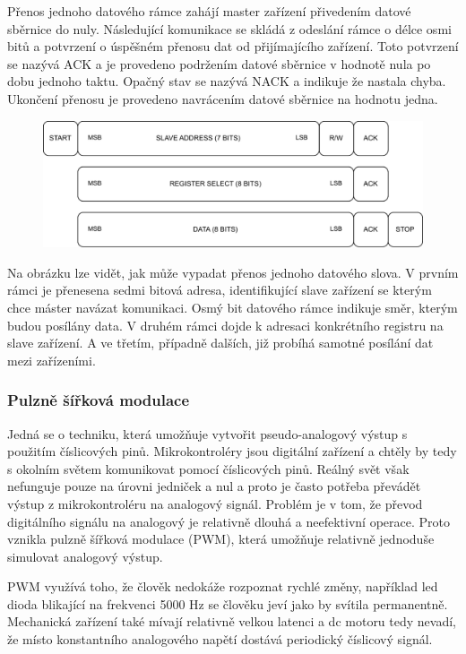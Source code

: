 Přenos jednoho datového rámce zahájí master zařízení přivedením datové sběrnice do nuly. Následující komunikace se skládá z odeslání rámce o délce osmi bitů a potvrzení o úspěšném přenosu dat od přijímajícího zařízení. Toto potvrzení se nazývá ACK a je provedeno podržením datové sběrnice v hodnotě nula po dobu jednoho taktu. Opačný stav se nazývá NACK a indikuje že nastala chyba. Ukončení přenosu je provedeno navrácením datové sběrnice na hodnotu jedna. \cite{um10204}

\begin{figure}[h!]
	\centering
	\includegraphics[scale=0.75]{obrazky-figures/i2c_data_word.pdf}
	\caption{}
	\label{}
\end{figure}

Na obrázku lze vidět, jak může vypadat přenos jednoho datového slova. V prvním rámci je přenesena sedmi bitová adresa, identifikující slave zařízení se kterým chce máster navázat komunikaci. Osmý bit datového rámce indikuje směr, kterým budou posílány data. V druhém rámci dojde k adresaci konkrétního registru na slave zařízení. A ve třetím, případně dalších, již probíhá samotné posílání dat mezi zařízeními. \cite{an4481}

\subsubsection*{Pulzně šířková modulace}
Jedná se o techniku, která umožňuje vytvořit pseudo-analogový výstup s použitím číslicových pinů. Mikrokontroléry jsou digitální zařízení a chtěly by tedy s okolním světem komunikovat pomocí číslicových pinů. Reálný svět však nefunguje pouze na úrovni jedniček a nul a proto je často potřeba převádět výstup z mikrokontroléru na analogový signál. Problém je v tom, že převod digitálního signálu na analogový je relativně dlouhá a neefektivní operace. Proto vznikla pulzně šířková modulace (PWM), která umožňuje relativně jednoduše simulovat analogový výstup. \cite{embeded_robotics}

PWM využívá toho, že člověk nedokáže rozpoznat rychlé změny, například led dioda blikající na frekvenci 5000 Hz se člověku jeví jako by svítila permanentně. Mechanická zařízení také mívají relativně velkou latenci a dc motoru tedy nevadí, že místo konstantního analogového napětí dostává periodický číslicový signál.

